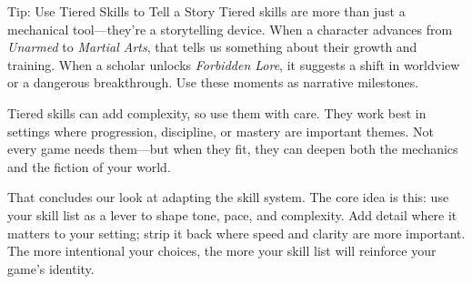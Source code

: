 \begin{CommentBox}{Tip: Use Tiered Skills to Tell a Story}
Tiered skills are more than just a mechanical tool—they're a storytelling device. When a character advances from \textit{Unarmed} to \textit{Martial Arts}, that tells us something about their growth and training. When a scholar unlocks \textit{Forbidden Lore}, it suggests a shift in worldview or a dangerous breakthrough. Use these moments as narrative milestones.
\end{CommentBox}

Tiered skills can add complexity, so use them with care. They work best in settings where progression, discipline, or mastery are important themes. Not every game needs them—but when they fit, they can deepen both the mechanics and the fiction of your world.


\vspace{1\baselineskip}
That concludes our look at adapting the skill system. The core idea is this: use your skill list as a lever to shape tone, pace, and complexity. Add detail where it matters to your setting; strip it back where speed and clarity are more important. The more intentional your choices, the more your skill list will reinforce your game’s identity.


